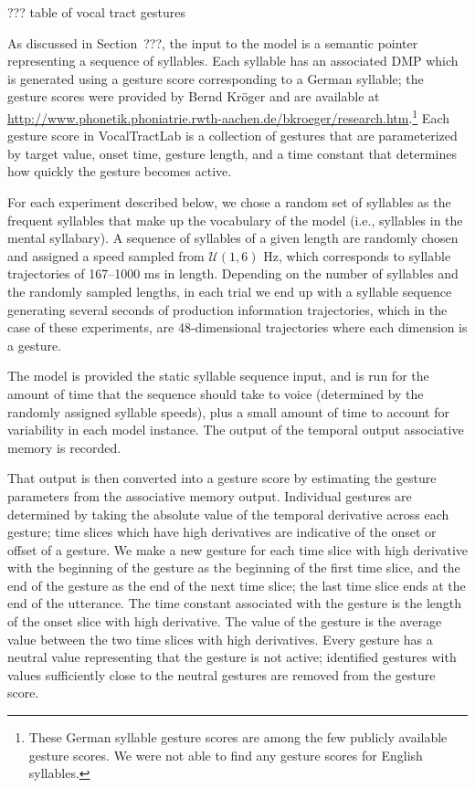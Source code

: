 ??? table of vocal tract gestures

As discussed in Section~???,
the input to the model
is a semantic pointer
representing a sequence of syllables.
Each syllable has an associated DMP
which is generated using
a gesture score corresponding to
a German syllable;
the gesture scores were provided by
Bernd Kr\"{o}ger and are available at
\url{http://www.phonetik.phoniatrie.rwth-aachen.de/bkroeger/research.htm}.\footnote{
  These German syllable gesture scores are among
  the few publicly available gesture scores.
  We were not able to find any gesture scores
  for English syllables.}
Each gesture score in VocalTractLab
is a collection of
gestures that are parameterized by target value,
onset time, gesture length,
and a time constant that determines
how quickly the gesture becomes active.

For each experiment described below,
we chose a random set of syllables
as the frequent syllables
that make up the vocabulary
of the model
(i.e., syllables in the mental syllabary).
A sequence of syllables of a given length
are randomly chosen and assigned a speed
sampled from $\mathcal{U}(1, 6)$ Hz,
which corresponds to syllable trajectories of
167--1000 ms in length.
Depending on the number of syllables
and the randomly sampled lengths,
in each trial we end up with a syllable sequence
generating several seconds
of production information trajectories,
which in the case of these experiments,
are 48-dimensional trajectories
where each dimension is a gesture.

The model is provided the static syllable sequence input,
and is run for the amount of time that the sequence
should take to voice (determined by the
randomly assigned syllable speeds),
plus a small amount of time to account
for variability in each model instance.
The output of the temporal output associative memory
is recorded.

That output is then converted into a gesture score
by estimating the gesture parameters
from the associative memory output.
Individual gestures are determined by
taking the absolute value of the temporal derivative
across each gesture;
time slices which have high derivatives
are indicative of the onset or offset of a gesture.
We make a new gesture for each
time slice with high derivative
with the beginning of the gesture as
the beginning of the first time slice,
and the end of the gesture
as the end of the next time slice;
the last time slice ends at the end
of the utterance.
The time constant associated
with the gesture
is the length of
the onset slice with high derivative.
The value of the gesture is the
average value between the two
time slices with high derivatives.
Every gesture has a neutral value
representing that the gesture
is not active;
identified gestures with values
sufficiently close to the neutral gestures
are removed from the gesture score.

